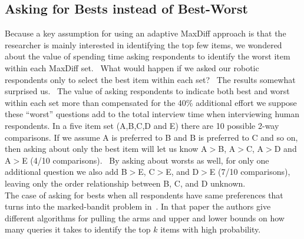 \documentclass[a4paper,12pt]{article}
\begin{document}
\subsection{Asking for Bests instead of Best-Worst}
Because a key assumption for using an adaptive MaxDiff approach is that the researcher is mainly interested in identifying the top few items, we wondered about the value of spending time asking respondents to identify the worst item within each MaxDiff set.  What would happen if we asked our robotic respondents only to select the best item within each set?  The results somewhat surprised us.  The value of asking respondents to indicate both best and worst within each set more than compensated for the 40\% additional effort we suppose these ``worst'' questions add to the total interview time when interviewing human respondents.
In a five item set (A,B,C,D and E) there are 10 possible 2-way comparisons. If we assume A is preferred to B and B is preferred to C and so on, then asking about only the best item will let us know A$>$B, A$>$C, A$>$D and A$>$E (4/10 comparisons).  By asking about worsts as well, for only one additional question we also add B$>$E, C$>$E, and D$>$E (7/10 comparisons), leaving only the order relationship between B, C, and D unknown.\\ 
The case of asking for bests when all respondents have same preferences that turns into the marked-bandit problem in~\cite{simchowitz2016best}. In that paper the authors give different algorithms for pulling the arms and upper and lower bounds on how many queries it takes to identify the top $k$ items with high probability. 


\end{document}
